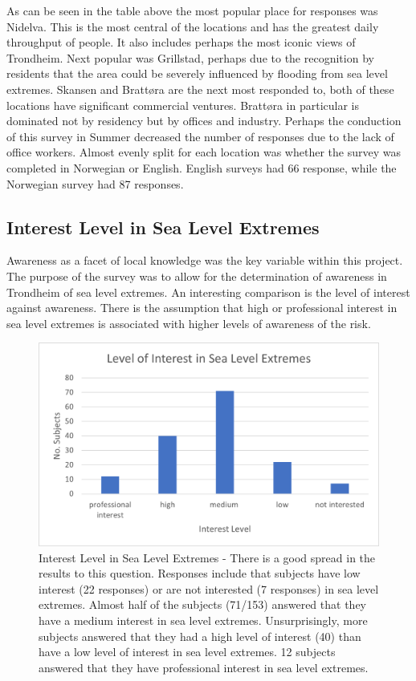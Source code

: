 As can be seen in the table above the most popular place for responses was Nidelva. This is the most central of the locations and has the greatest daily throughput of people. It also includes perhaps the most iconic views of Trondheim. Next popular was Grillstad, perhaps due to the recognition by residents that the area could be severely influenced by flooding from sea level extremes. Skansen and Brattøra are the next most responded to, both of these locations have significant commercial ventures. Brattøra in particular is dominated not by residency but by offices and industry. Perhaps the conduction of this survey in Summer decreased the number of responses due to the lack of office workers. Almost evenly split for each location was whether the survey was completed in Norwegian or English. English surveys had 66 response, while the Norwegian survey had 87 responses.  

\subsection{Interest Level in Sea Level Extremes}
Awareness as a facet of local knowledge was the key variable within this project. The purpose of the survey was to allow for the determination of awareness in Trondheim of sea level extremes. An interesting comparison is the level of interest against awareness. There is the assumption that high or professional interest in sea level extremes is associated with higher levels of awareness of the risk. 
\begin{figure}[h!]
    \centering
    \includegraphics{fig_results/interest-level.png}
    \caption{Interest Level in Sea Level Extremes - There is a good spread in the results to this question. Responses include that subjects have low interest (22 responses) or are not interested (7 responses) in sea level extremes. Almost half of the subjects (71/153) answered that they have a medium interest in sea level extremes. Unsurprisingly, more subjects answered that they had a high level of interest (40) than have a low level of interest in sea level extremes. 12 subjects answered that they have professional interest in sea level extremes. }
    \label{fig:my_interest_level}
\end{figure}
